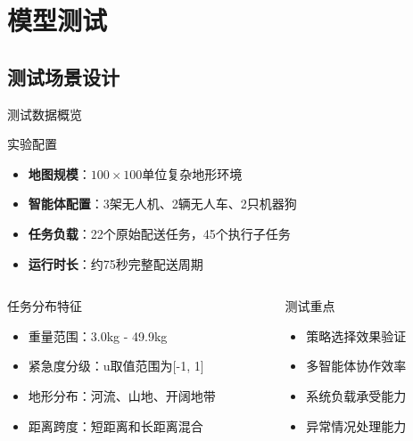 \documentclass[
10pt,
aspectratio=169,
]{beamer}
\begin{document}
\section{模型测试}

\subsection{测试场景设计}

\begin{frame}{测试数据概览}
    \begin{block}{实验配置}
        \begin{itemize}
            \item \textbf{地图规模}：$100\times 100$单位复杂地形环境
            \item \textbf{智能体配置}：3架无人机、2辆无人车、2只机器狗
            \item \textbf{任务负载}：22个原始配送任务，45个执行子任务
            \item \textbf{运行时长}：约75秒完整配送周期
        \end{itemize}
    \end{block}
    
    \begin{columns}
        \begin{column}{0.5\textwidth}
            \begin{exampleblock}{任务分布特征}
                \begin{itemize}
                    \item 重量范围：3.0kg - 49.9kg
                    \item 紧急度分级：u取值范围为[-1, 1]
                    \item 地形分布：河流、山地、开阔地带
                    \item 距离跨度：短距离和长距离混合
                \end{itemize}
            \end{exampleblock}
        \end{column}
        \begin{column}{0.5\textwidth}
            \begin{alertblock}{测试重点}
                \begin{itemize}
                    \item 策略选择效果验证
                    \item 多智能体协作效率
                    \item 系统负载承受能力
                    \item 异常情况处理能力
                \end{itemize}
            \end{alertblock}
        \end{column}
    \end{columns}
\end{frame}
\end{document}
